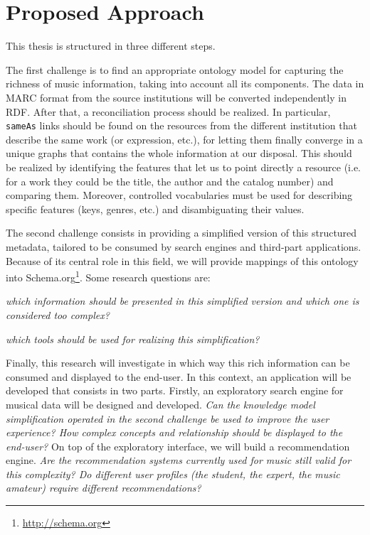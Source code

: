 \documentclass{llncs}
\begin{document}

\section{Proposed Approach}
\label{sec:approach}
This thesis is structured in three different steps.

The first challenge is to find an appropriate ontology model for capturing the richness of music information, taking into account all its components. The data in MARC format from the source institutions will be converted independently in RDF. After that, a reconciliation process should be realized. In particular, \texttt{sameAs} links should be found on the resources from the different institution that describe the same work (or expression, etc.), for letting them finally converge in a unique graphs that contains the whole information at our disposal. This should be realized by identifying the features that let us to point directly a resource (i.e. for a work they could be the title, the author and the catalog number) and comparing them. Moreover, controlled vocabularies must be used for describing specific features (keys, genres, etc.) and disambiguating their values.

The second challenge consists in providing a simplified version of this structured metadata, tailored to be consumed by search engines and third-part applications. Because of its central role in this field, we will provide mappings of this ontology into Schema.org\footnote{\url{http://schema.org}}. Some research questions are:
\begin{enumerate*}
\item{\textit{which information should be presented in this simplified version and which one is considered too complex?}}
\item{\textit{which tools should be used for realizing this simplification?}}
\end{enumerate*}

Finally, this research will investigate in which way this rich information can be consumed and displayed to the end-user. In this context, an application will be developed that consists in two parts. Firstly, an exploratory search engine for musical data will be designed and developed. \textit{Can the knowledge model simplification operated in the second challenge be used to improve the user experience? How complex concepts and relationship should be displayed to the end-user?} On top of the exploratory interface, we will build a recommendation engine. \textit{Are the recommendation systems currently used for music still valid for this complexity? Do different user profiles (the student, the expert, the music amateur) require different recommendations?}
\end{document}

